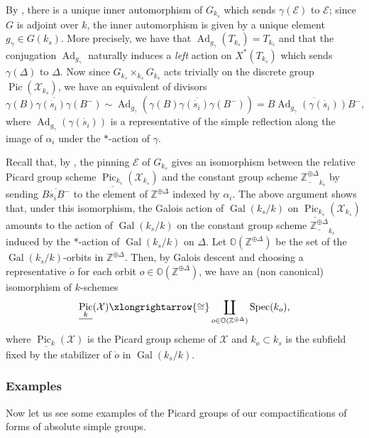 \documentclass[11pt, reqno]{amsart}
\theoremstyle{plain}
\theoremstyle{definition}
\DeclareMathOperator{\Ad}{\mathrm{Ad}}			%
\DeclareMathOperator{\Gal}{Gal}
\DeclareMathOperator{\Pic}{Pic}    %
\DeclareMathOperator{\Spec}{Spec}		%
\begin{document}
By \cite[exposé~XXIV, lemme~1.5]{SGA3III}, there is a unique inner automorphism of $G_{k_s}$ which sends $\gamma(\mathcal{E})$ to $\mathcal{E}$; since $G$ is adjoint over $k$, the inner automorphism is given by a unique element $g_{\gamma}\in G(k_s)$. More precisely, we have that $\Ad_{g_{\gamma}}(T_{k_s})=T_{k_s}$ and that the conjugation $\Ad_{g_{\gamma}}$ naturally induces a \emph{left} action on $X^*(T_{k_s})$ which sends $\gamma(\Delta)$ to $\Delta$. Now since $G_{k_s}\times_{k_s}G_{k_s}$ acts trivially on the discrete group $\Pic(\mathcal{X}_{k_s})$, we have an equivalent of divisors $$\overline{\gamma(B)\gamma(\dot{s_i})\gamma(B^-)}\sim\Ad_{g_{\gamma}}(\overline{\gamma(B)\gamma(\dot{s_i})\gamma(B^-)})=\overline{B\Ad_{g_{\gamma}}(\gamma(\dot{s_i}))B^-},$$
where $\Ad_{g_{\gamma}}(\gamma(\dot{s_i}))$ is a representative of the simple reflection along the image of $\alpha_i$ under the $\ast$-action of $\gamma$.

Recall that, by , the pinning $\mathcal{E}$ of $G_{k_s}$ 
gives an isomorphism between the relative Picard group scheme $\underline{\Pic_{k_s}}(\mathcal{X}_{k_s})$ and the constant group scheme $\underline{\mathbb{Z}^{\oplus \Delta}}_{k_s}$ by sending $\overline{B\dot{s_i}B^-}$ to the element of $\mathbb{Z}^{\oplus \Delta}$ indexed by $\alpha_i$.
The above argument shows that, under this isomorphism, the Galois action of $\Gal(k_s/k)$ on $\underline{\Pic_{k_s}}(\mathcal{X}_{k_s})$ amounts to the action of $\Gal(k_s/k)$ on the constant group scheme $\underline{\mathbb{Z}^{\oplus \Delta}}_{k_s}$ induced by the $\ast$-action of $\Gal(k_s/k)$ on $\Delta$. Let $\mathbb{O}(\mathbb{Z}^{\oplus \Delta})$ be the set of the $\Gal(k_s/k)$-orbits in $\mathbb{Z}^{\oplus \Delta}$. Then, by Galois descent and choosing a representative $\dot{o}$ for each orbit $o\in \mathbb{O}(\mathbb{Z}^{\oplus \Delta})$, we have an (non canonical) isomorphism of $k$-schemes
$$\underline{\Pic_k}(\mathcal{X})\xlongrightarrow{\cong}\coprod_{o\in \mathbb{O}(\mathbb{Z}^{\oplus \Delta})}\Spec(k_o),$$
where $\underline{\Pic_k}(\mathcal{X})$ is the Picard group scheme of $\mathcal{X}$ and $k_o\subset k_s$ is the subfield fixed by the stabilizer of $\dot{o}$ in $\Gal(k_s/k)$.


\subsubsection{Examples}
Now let us see some examples of the Picard groups of our compactifications of forms of absolute simple groups. 
\end{document}
